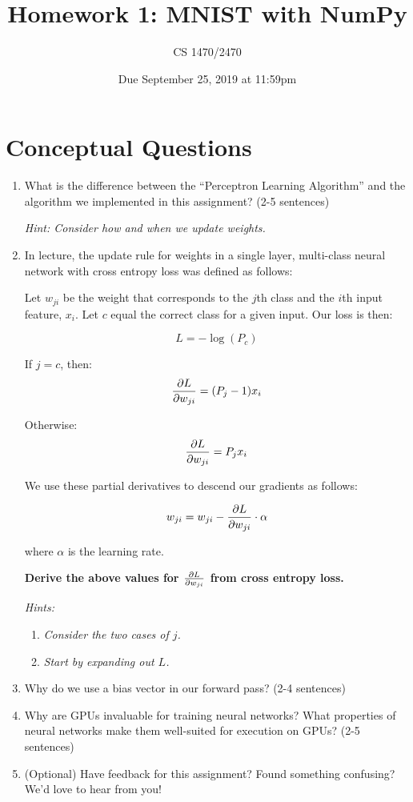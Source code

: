 \documentclass{article}
\title{Homework 1: MNIST with NumPy}
\date{Due September 25, 2019 at 11:59pm}
\author{CS 1470/2470}
\begin{document}
\maketitle

\section{Conceptual Questions}
\begin{enumerate}

  \item What is the difference between the ``Perceptron Learning Algorithm'' and the algorithm we implemented in this assignment? (2-5 sentences) 
  
    \textit{Hint: Consider how and when we update weights.}

    \item In lecture, the update rule for weights in a single layer, multi-class neural network with cross entropy loss was defined as follows:
    
   
   
   
   Let $w_{ji}$ be the weight that corresponds to the $j$th class and the $i$th input feature, $x_i$. Let $c$ equal the correct class for a given input. Our loss is then:
  
       \[L = -\log(P_c) \]

    If $j=c$, then: 
    \[ \pdv{L}{w_{ji}} = (P_j-1)x_i  \]
    
    Otherwise:
        \[ \pdv{L}{w_{ji}} = P_jx_i  \]

    We use these partial derivatives to descend our gradients as follows:    
    
    \[ w_{ji} = w_{ji} -  \pdv{L}{w_{ji}}  \cdot \alpha  \]
    
    where $\alpha$ is the learning rate.

    \textbf{Derive the above values for $\pdv{L}{w_{ji}}$ from cross entropy loss.}
    
    \textit{Hints:}
    \begin{enumerate}
        \item \textit{Consider the two cases of $j$.}
        \item \textit{Start by expanding out $L$.}
        
    \end{enumerate}

    \item Why do we use a bias vector in our forward pass? (2-4 sentences)

    
\item Why are GPUs invaluable for training neural networks? What properties of neural networks make them well-suited for execution on GPUs? (2-5 sentences)

\item (Optional) Have feedback for this assignment? Found something confusing? We'd love to hear from you!



\end{enumerate}
\end{document}
